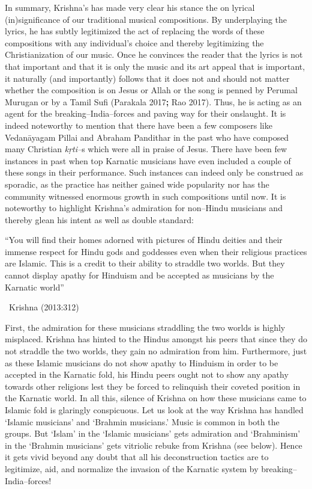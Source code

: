 In summary, Krishna’s has made very clear his stance the on lyrical (in)significance of our traditional musical compositions. By underplaying the lyrics, he has subtly legitimized the act of replacing the words of these compositions with any individual’s choice and thereby legitimizing the Christianization of our music. Once he convinces the reader that the lyrics is not that important and that it is only the music and its art appeal that is important, it naturally (and importantly) follows that it does not and should not matter whether the composition is on Jesus or Allah or the song is penned by Perumal Murugan or by a Tamil Sufi (Parakala 2017\textbf{; }Rao 2017). Thus, he is acting as an agent for the breaking–India–forces and paving way for their onslaught. It is indeed noteworthy to mention that there have been a few composers like Vedanāyagam Pillai and Abraham Pandithar in the past who have composed many Christian \textit{kṛti–}s which were all in praise of Jesus. There have been few instances in past when top Karnatic musicians have even included a couple of these songs in their performance. Such instances can indeed only be construed as sporadic, as the practice has neither gained wide popularity nor has the community witnessed enormous growth in such compositions until now. It is noteworthy to highlight Krishna’s admiration for non–Hindu musicians and thereby glean his intent as well as double standard:

\begin{myquote}
“You will find their homes adorned with pictures of Hindu deities and their immense respect for Hindu gods and goddesses even when their religious practices are Islamic. This is a credit to their ability to straddle two worlds. But they cannot display apathy for Hinduism and be accepted as musicians by the Karnatic world” 

~\hfill Krishna (2013:312)
\end{myquote}

First, the admiration for these musicians straddling the two worlds is highly misplaced. Krishna has hinted to the Hindus amongst his peers that since they do not straddle the two worlds, they gain no admiration from him. Furthermore, just as these Islamic musicians do not show apathy to Hinduism in order to be accepted in the Karnatic fold, his Hindu peers ought not to show any apathy towards other religions lest they be forced to relinquish their coveted position in the Karnatic world. In all this, silence of Krishna on how these musicians came to Islamic fold is glaringly conspicuous. Let us look at the way Krishna has handled ‘Islamic musicians’ and ‘Brahmin musicians.’ Music is common in both the groups. But ‘Islam’ in the ‘Islamic musicians’ gets admiration and ‘Brahminism’ in the ‘Brahmin musicians’ gets vitriolic rebuke from Krishna (see below). Hence it gets vivid beyond any doubt that all his deconstruction tactics are to legitimize, aid, and normalize the invasion of the Karnatic system by breaking–India–forces!


